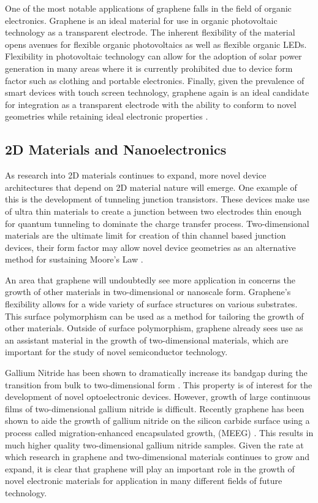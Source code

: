  One of the most notable applications of graphene falls in the field of organic electronics. Graphene is an ideal material for use in organic photovoltaic technology as a transparent electrode. The inherent flexibility of the material opens avenues for flexible organic photovoltaics as well as flexible organic LEDs. Flexibility in photovoltaic technology can allow for the adoption of solar power generation in many areas where it is currently prohibited due to device form factor such as clothing and portable electronics. Finally, given the prevalence of smart devices with touch screen technology, graphene again is an ideal candidate for integration as a transparent electrode with the ability to conform to novel geometries while retaining ideal electronic properties \cite{Wolf-apps}.

 \subsection{2D Materials and Nanoelectronics}
 As research into 2D materials continues to expand, more novel device architectures that depend on 2D material nature will emerge. One example of this is the development of tunneling junction transistors. These devices make use of ultra thin materials to create a junction between two electrodes thin enough for quantum tunneling to dominate the charge transfer process. Two-dimensional materials are the ultimate limit for creation of thin channel based junction devices, their form factor may allow novel device geometries as an alternative method for sustaining Moore's Law \cite{2d-electronics}.

 An area that graphene will undoubtedly see more application in concerns the growth of other materials in two-dimensional or nanoscale form. Graphene's flexibility allows for a wide variety of surface structures on various substrates. This surface polymorphism can be used as a method for tailoring the growth of other materials. Outside of surface polymorphism, graphene already sees use as an assistant material in the growth of two-dimensional materials, which are important for the study of novel semiconductor technology.

	Gallium Nitride has been shown to dramatically increase its bandgap during the transition from bulk to two-dimensional form \cite{graphene-encap}. This property is of interest for the development of novel optoelectronic devices. However, growth of large continuous films of two-dimensional gallium nitride is difficult. Recently graphene has been shown to aide the growth of gallium nitride on the silicon carbide surface using a process called migration-enhanced encapsulated growth, (MEEG) \cite{graphene-encap}.  This results in much higher quality two-dimensional gallium nitride samples. Given the rate at which research in graphene and two-dimensional materials continues to grow and expand, it is clear that graphene will play an important role in the growth of novel electronic materials for application in many different fields of future technology.



